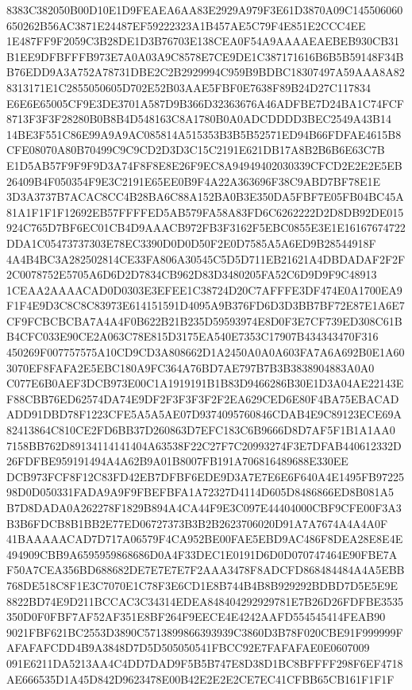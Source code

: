 \documentclass[UTF8,fontset=fandol,zihao=-4,a4paper]{ctexart}
\begin{document}
{{8383C382050B00D10E1D9FEAEA6AA83E2929A979F3E61D3870A09C145506060650262B56AC3871E24487EF59222323A1B457AE5C79F4E851E2CCC4EE
1E487FF9F2059C3B28DE1D3B76703E138CEA0F54A9AAAAEAEBEB930CB31B1EE9DFBFFFB973E7A0A03A9C8578E7CE9DE1C387171616B6B5B59148F34B
B76EDD9A3A752A78731DBE2C2B2929994C959B9BDBC18307497A59AAA8A828313171E1C2855050605D702E52B03AAE5FBF0E7638F89B24D27C117834
E6E6E65005CF9E3DE3701A587D9B366D32363676A46ADFBE7D24BA1C74FCF8713F3F3F28280B0B8B4D548163C8A1780B0A0ADCDDDD3BEC2549A43B14
14BE3F551C86E99A9A9AC085814A515353B3B5B52571ED94B66FDFAE4615B8CFE08070A80B70499C9C9CD2D3D3C15C2191E621DB17A8B2B6B6E63C7B
E1D5AB57F9F9F9D3A74F8F8E8E26F9EC8A94949402030339CFCD2E2E2E5EB26409B4F050354F9E3C2191E65EE0B9F4A22A363696F38C9ABD7BF78E1E
3D3A3737B7ACAC8CC4B28BA6C88A152BA0B3E350DA5FBF7E05FB04BC45A81A1F1F1F12692EB57FFFFED5AB579FA58A83FD6C6262222D2D8DB92DE015
924C765D7BF6EC01CB4D9AAACB972FB3F3162F5EBC0855E3E1E16167674722DDA1C05473737303E78EC3390D0D0D50F2E0D7585A5A6ED9B28544918F
4A4B4BC3A282502814CE33FA806A30545C5D5D711EB21621A4DBDADAF2F2F2C0078752E5705A6D6D2D7834CB962D83D3480205FA52C6D9D9F9C48913
1CEAA2AAAACAD0D0303E3EFEE1C38724D20C7AFFFE3DF474E0A1700EA9F1F4E9D3C8C8C83973E614151591D4095A9B376FD6D3D3BB7BF72E87E1A6E7
CF9FCBCBCBA7A4A4F0B622B21B235D59593974E8D0F3E7CF739ED308C61BB4CFC033E90CE2A063C78E815D3175EA540E7353C17907B434343470F316
450269F007757575A10CD9CD3A808662D1A2450A0A0A603FA7A6A692B0E1A603070EF8FAFA2E5EBC180A9FC364A76BD7AE797B7B3B3838904883A0A0
C077E6B0AEF3DCB973E00C1A1919191B1B83D9466286B30E1D3A04AE22143EF88CBB76ED62574DA74E9DF2F3F3F3F2F2EA629CED6E80F4BA75EBACAD
ADD91DBD78F1223CFE5A5A5AE07D9374095760846CDAB4E9C89123ECE69A82413864C810CE2FD6BB37D260863D7EFC183C6B9666D8D7AF5F1B1A1AA0
7158BB762D89134114141404A63538F22C27F7C20993274F3E7DFAB440612332D26FDFBE959191494A4A62B9A01B8007FB191A706816489688E330EE
DCB973FCF8F12C83FD42EB7DFBF6EDE9D3A7E7E6E6F640A4E1495FB9722598D0D050331FADA9A9F9FBEFBFA1A72327D4114D605D8486866ED8B081A5
B7D8DADA0A262278F1829B894A4CA44F9E3C097E44404000CBF9CFE00F3A3B3B6FDCB8B1BB2E77ED06727373B3B2B2623706020D91A7A7674A4A4A0F
41BAAAAACAD7D717A06579F4CA952BE00FAE5EBD9AC486F8DEA28E8E4E494909CBB9A6595959868686D0A4F33DEC1E0191D6D0D070747464E90FBE7A
F50A7CEA356BD688682DE7E7E7E7F2AAA3478F8ADCFD868484484A4A5EBB768DE518C8F1E3C7070E1C78F3E6CD1E8B744B4B8B929292BDBD7D5E5E9E
8822BD74E9D211BCCAC3C34314EDEA848404292929781E7B26D26FDFBE3535350D0F0FBF7AF52AF351E8BF264F9EECE4E4242AAFD554545414FEAB90
9021FBF621BC2553D3890C5713899866393939C3860D3B78F020CBE91F999999FAFAFAFCDD4B9A3848D7D5D505050541FBCC92E7FAFAFAE0E0607009
091E6211DA5213AA4C4DD7DAD9F5B5B747E8D38D1BC8BFFFF298F6EF4718AE666535D1A45D842D9623478E00B42E2E2E2CE7EC41CFBB65CB161F1F1F
}}
\end{document}
